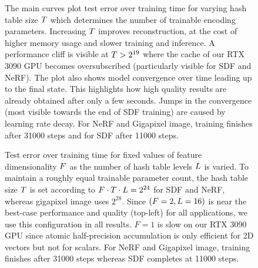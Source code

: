 \documentclass[acmtog,authorversion]{acmart}
\begin{document}
\begin{figure}
  \sffamily
  \small
  \vspace{-5mm}
  \begin{center}
  \pgfplotsset{width=6.1cm, height=4.5cm}
  
  \hfill
  
  \hfill
  
  \end{center}
  \vspace{-3mm}
  \caption{\label{fig:image_t_sweep}%
  The main curves plot test error over training time for varying hash table size $T$ which determines the number of trainable encoding parameters. Increasing $T$ improves reconstruction, at the cost of higher memory usage and slower training and inference. A performance cliff is visible at ${T > 2^{19}}$ where the cache of our RTX 3090 GPU becomes oversubscribed (particularly visible for SDF and NeRF). The plot also shows model convergence over time leading up to the final state. This highlights how high quality results are already obtained after only a few seconds. Jumps in the convergence (most visible towards the end of SDF training) are caused by learning rate decay. For NeRF and Gigapixel image, training finishes after \num{31000} steps and for SDF after \num{11000} steps. 
  }
\end{figure}

\begin{figure}
  \sffamily
  \small
  \vspace{-1mm}
  \begin{center}
  \pgfplotsset{width=6.1cm, height=4cm}
  
  \hfill
  
  \hfill
  
  \end{center}
  \vspace{-3mm}
  \caption{\label{fig:image_ftl_sweep}%
    Test error over training time for fixed values of feature dimensionality $F$ as the number of hash table levels $L$ is varied.
    To maintain a roughly equal trainable parameter count, the hash table size $T$ is set according to ${F \cdot T \cdot L = 2^{24}}$ for SDF and NeRF, whereas gigapixel image uses $2^{28}$.
    Since ${(F=2,L = 16)}$ is near the best-case performance and quality (top-left) for all applications, we use this configuration in all results.
    ${F=1}$ is slow on our RTX 3090 GPU since atomic half-precision accumulation is only efficient for 2D vectors but not for scalars.
    For NeRF and Gigapixel image, training finishes after \num{31000} steps whereas SDF completes at \num{11000} steps. 
  }\vspace{-2mm}
\end{figure}
\end{document}

